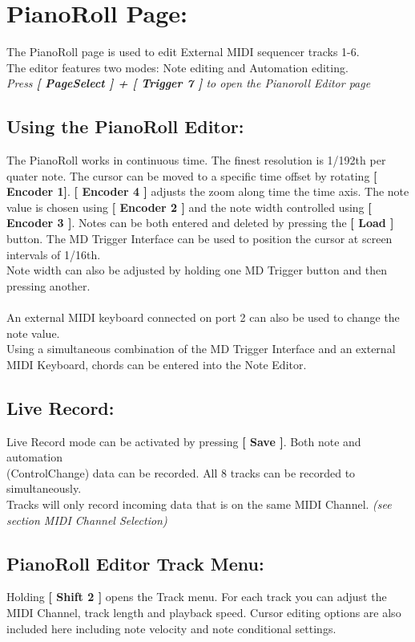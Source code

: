 \chapter{PianoRoll Page:}
The PianoRoll page is used to edit External MIDI sequencer tracks 1-6.\\
The editor features two modes: Note editing and Automation editing.
\\
\textit{Press \textbf{[ PageSelect ] + [ Trigger 7 ]} to open the Pianoroll Editor page}
\section{Using the PianoRoll Editor:}
The PianoRoll works in continuous time. The finest resolution is 1/192th per quater note. The cursor can be moved to a specific time offset by rotating \textbf{[ Encoder 1]}. \textbf{[ Encoder 4 ]} adjusts the zoom along time the time axis. The note value is chosen using \textbf{[ Encoder 2 ]} and the note width controlled using \textbf{[ Encoder 3 ]}. Notes can be both entered and deleted by pressing the \textbf{[ Load ]} button.
\newpage
The MD Trigger Interface can be used to position the cursor at screen intervals of 1/16th.\\
Note width can also be adjusted by holding one MD Trigger button and then pressing another.\\\\
An external MIDI keyboard connected on port 2 can also be used to change the note value.\\
Using a simultaneous combination of the MD Trigger Interface and an external MIDI Keyboard, chords can be entered into the Note Editor.
\section{Live Record:}
Live Record mode can be activated by pressing  \textbf{[ Save ]}. Both note and automation \\(ControlChange) data can be recorded. All 8 tracks can be recorded to simultaneously.
\\Tracks will only record incoming data that is on the same MIDI Channel. \textit{(see section MIDI Channel Selection)}

\section{PianoRoll Editor Track Menu:}
Holding \textbf{[ Shift 2 ]} opens the Track menu. For each track you can adjust the MIDI Channel, track length and playback speed. Cursor editing options are also included here including note velocity and note conditional settings.

